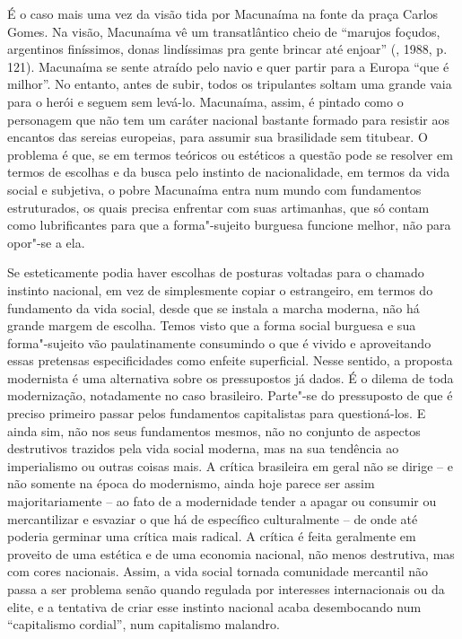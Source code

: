 {É o caso mais uma vez da visão tida por Macunaíma na fonte da praça
Carlos Gomes. Na visão, Macunaíma vê um transatlântico cheio de
``marujos foçudos, argentinos finíssimos, donas lindíssimas pra gente
brincar até enjoar'' (, 1988, p. 121). Macunaíma se sente atraído
pelo navio e quer partir para a Europa ``que é milhor''. No entanto,
antes de subir, todos os tripulantes soltam uma grande vaia para o herói
e seguem sem levá-lo. Macunaíma, assim, é pintado como o personagem que
não tem um caráter nacional bastante formado para resistir aos encantos
das sereias europeias, para assumir sua brasilidade sem titubear. O problema é que,
se em termos teóricos ou estéticos a questão pode se resolver em termos
de escolhas e da busca pelo instinto de nacionalidade, em termos da vida
social e subjetiva, o pobre Macunaíma entra num mundo com fundamentos estruturados,
os quais precisa enfrentar com suas artimanhas, que só contam como
lubrificantes para que a forma"-sujeito burguesa funcione melhor, não
para opor"-se a ela.

Se esteticamente podia haver escolhas de posturas voltadas para o
chamado instinto nacional, em vez de simplesmente copiar o estrangeiro,
em termos do fundamento da vida social, desde que se instala a marcha
moderna, não há grande margem de escolha. Temos visto que a forma social
burguesa e sua forma"-sujeito vão paulatinamente consumindo o que é
vivido e aproveitando essas pretensas especificidades como enfeite
superficial. Nesse sentido, a proposta modernista é uma alternativa
sobre os pressupostos já dados. É o dilema de toda modernização,
notadamente no caso brasileiro. Parte"-se do pressuposto
de que é preciso primeiro passar pelos
fundamentos capitalistas para questioná-los. E ainda sim, não nos seus
fundamentos mesmos, não no conjunto de aspectos destrutivos trazidos
pela vida social moderna, mas na sua tendência ao imperialismo ou outras
coisas mais. A crítica brasileira em geral não se dirige -- e não
somente na época do modernismo, ainda hoje parece ser assim
majoritariamente -- ao fato de a modernidade tender a apagar ou consumir
ou mercantilizar e esvaziar o que há de específico culturalmente -- de
onde até poderia germinar uma crítica mais radical. A crítica é feita
geralmente em proveito de uma estética e de uma economia nacional, não
menos destrutiva, mas com cores nacionais. Assim, a vida social tornada
comunidade mercantil não passa a ser problema senão quando regulada por
interesses internacionais ou da elite, e a tentativa de criar esse
instinto nacional acaba desembocando num ``capitalismo cordial'', num
capitalismo malandro.

}
